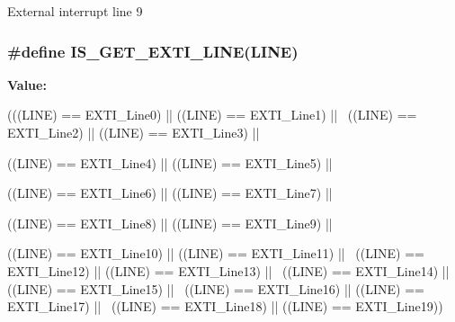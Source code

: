 \label{group__EXTI__Lines_ga340ca6bb77b7a2d7747c78e7d3370360}
External interrupt line 9 \hypertarget{group__EXTI__Lines_ga77c85c7b8426c6cfe91b4f5a2c58ecda}{
\subsubsection[{IS\_\-GET\_\-EXTI\_\-LINE}]{\setlength{\rightskip}{0pt plus 5cm}\#define IS\_\-GET\_\-EXTI\_\-LINE(LINE)}}
\label{group__EXTI__Lines_ga77c85c7b8426c6cfe91b4f5a2c58ecda}
{\bfseries Value:}
\begin{DoxyCode}
(((LINE) == EXTI_Line0) || ((LINE) == EXTI_Line1) || \
                            ((LINE) == EXTI_Line2) || ((LINE) == EXTI_Line3) || \
      
                            ((LINE) == EXTI_Line4) || ((LINE) == EXTI_Line5) || \
      
                            ((LINE) == EXTI_Line6) || ((LINE) == EXTI_Line7) || \
      
                            ((LINE) == EXTI_Line8) || ((LINE) == EXTI_Line9) || \
      
                            ((LINE) == EXTI_Line10) || ((LINE) == EXTI_Line11) ||
       \
                            ((LINE) == EXTI_Line12) || ((LINE) == EXTI_Line13) ||
       \
                            ((LINE) == EXTI_Line14) || ((LINE) == EXTI_Line15) ||
       \
                            ((LINE) == EXTI_Line16) || ((LINE) == EXTI_Line17) ||
       \
                            ((LINE) == EXTI_Line18) || ((LINE) == EXTI_Line19))
\end{DoxyCode}
